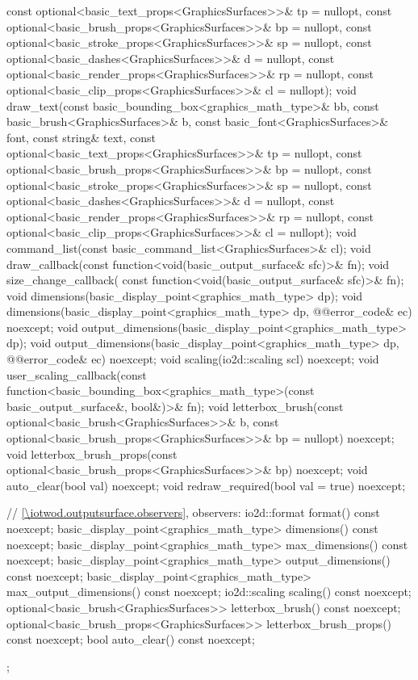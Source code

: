 \begin{codeblock}
{{      const optional<basic_text_props<GraphicsSurfaces>>& tp = nullopt,
      const optional<basic_brush_props<GraphicsSurfaces>>& bp = nullopt,
      const optional<basic_stroke_props<GraphicsSurfaces>>& sp = nullopt,
      const optional<basic_dashes<GraphicsSurfaces>>& d = nullopt,
      const optional<basic_render_props<GraphicsSurfaces>>& rp = nullopt,
      const optional<basic_clip_props<GraphicsSurfaces>>& cl = nullopt);
    void draw_text(const basic_bounding_box<graphics_math_type>& bb,
      const basic_brush<GraphicsSurfaces>& b,
      const basic_font<GraphicsSurfaces>& font, const string& text,
      const optional<basic_text_props<GraphicsSurfaces>>& tp = nullopt,
      const optional<basic_brush_props<GraphicsSurfaces>>& bp = nullopt,
      const optional<basic_stroke_props<GraphicsSurfaces>>& sp = nullopt,
      const optional<basic_dashes<GraphicsSurfaces>>& d = nullopt,
      const optional<basic_render_props<GraphicsSurfaces>>& rp = nullopt,
      const optional<basic_clip_props<GraphicsSurfaces>>& cl = nullopt);
    void command_list(const basic_command_list<GraphicsSurfaces>& cl);
    void draw_callback(const function<void(basic_output_surface& sfc)>& fn);
    void size_change_callback(
      const function<void(basic_output_surface& sfc)>& fn);
    void dimensions(basic_display_point<graphics_math_type> dp);
    void dimensions(basic_display_point<graphics_math_type> dp, @\stdqualifier{}@error_code& ec) noexcept;
    void output_dimensions(basic_display_point<graphics_math_type> dp);
    void output_dimensions(basic_display_point<graphics_math_type> dp, 
      @\stdqualifier{}@error_code& ec) noexcept;
    void scaling(io2d::scaling scl) noexcept;
    void user_scaling_callback(const
      function<basic_bounding_box<graphics_math_type>(const basic_output_surface&, bool&)>& fn);
    void letterbox_brush(const optional<basic_brush<GraphicsSurfaces>>& b,
      const optional<basic_brush_props<GraphicsSurfaces>>& bp = nullopt) noexcept;
    void letterbox_brush_props(const optional<basic_brush_props<GraphicsSurfaces>>& bp) noexcept;
    void auto_clear(bool val) noexcept;
    void redraw_required(bool val = true) noexcept;
	
    // \ref{\iotwod.outputsurface.observers}, observers:
    io2d::format format() const noexcept;
    basic_display_point<graphics_math_type> dimensions() const noexcept;
    basic_display_point<graphics_math_type> max_dimensions() const noexcept;
    basic_display_point<graphics_math_type> output_dimensions() const noexcept;
    basic_display_point<graphics_math_type> max_output_dimensions() const noexcept;
    io2d::scaling scaling() const noexcept;
    optional<basic_brush<GraphicsSurfaces>> letterbox_brush() const noexcept;
    optional<basic_brush_props<GraphicsSurfaces>> letterbox_brush_props() const noexcept;
    bool auto_clear() const noexcept;
  };
}
\end{codeblock}


